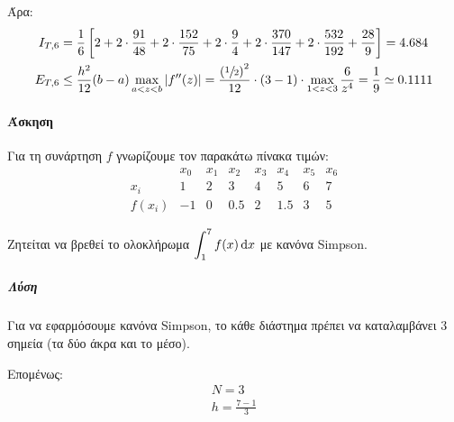 \documentclass[11pt,a4paper,notitlepage,fleqn,final]{article}
\begin{document}
    Άρα:
    \begin{align*}
    	I_{T,6} &= \frac{1}{6} \left[
    	2+2\cdot\frac{91}{48}+2\cdot\frac{152}{75}+2\cdot\frac{9}{4}
    	+2\cdot\frac{370}{147}+2\cdot\frac{532}{192}+\frac{28}{9}
    	\right] = 4.684 \\
    	E_{T,6} &\leq \frac{h^2}{12}(b-a)\max_{a<z<b}\left|f''(z)\right|
    	= \frac{\left(\sfrac{1}{2} \right)^2}{12}\cdot(3-1)
    	\cdot\max_{1<z<3}\frac{6}{z^4} = \frac{1}{9} \simeq 0.1111
    \end{align*}

    \paragraph{Άσκηση}
    Για τη συνάρτηση \( f \) γνωρίζουμε τον παρακάτω πίνακα τιμών:
    \[
    \begin{array}{r|c|c|c|c|c|c|c}
    	       & x_0 & x_1 & x_2 & x_3 & x_4 & x_5 & x_6 \\[2ex]
    	   x_i &  1  &  2  &  3  &  4  &  5  &  6  &  7  \\ \hline
    	f(x_i) & -1  &  0  & 0.5 &  2  & 1.5 &  3  &  5
    \end{array}
    \]

    Ζητείται να βρεθεί το ολοκλήρωμα \( \displaystyle \int_1^7 f(x)
    \mathop{}\!\mathrm{d} x \) με κανόνα Simpson.

    \subparagraph{Λύση}
    Για να εφαρμόσουμε κανόνα Simpson, το κάθε διάστημα πρέπει να
    καταλαμβάνει 3 σημεία (τα δύο άκρα και το μέσο).


    Επομένως:
    \begin{gather*}
    	N = 3 \\
    	h=\frac{7-1}{3}
    \end{gather*}
\end{document}
